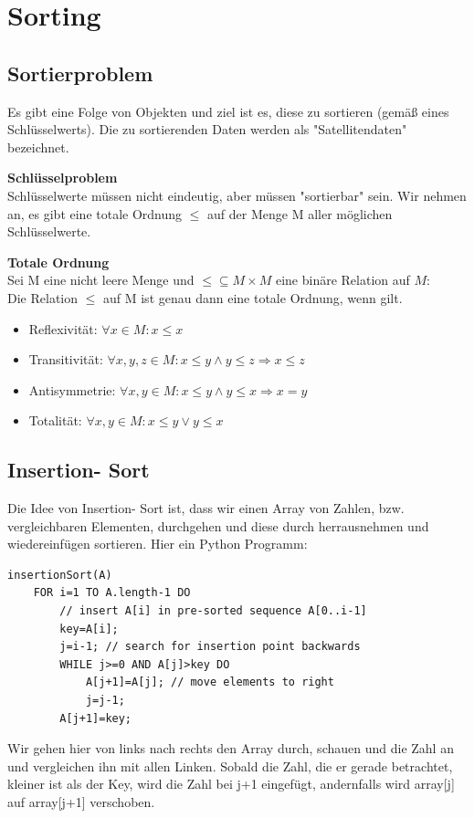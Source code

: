 \documentclass{article}
\begin{document}
    \newpage

    \section{Sorting}
        \subsection{Sortierproblem}
            Es gibt eine Folge von Objekten und ziel ist es, diese zu sortieren (gemäß eines Schlüsselwerts). 
            Die zu sortierenden Daten werden als "Satellitendaten" bezeichnet. 

            \textbf{Schlüsselproblem} \\
            Schlüsselwerte müssen nicht eindeutig, aber müssen "sortierbar" sein. Wir nehmen an, es gibt eine totale Ordnung $\leq$ auf der Menge M aller möglichen Schlüsselwerte.

            \textbf{Totale Ordnung} \\
            Sei M eine nicht leere Menge und $\leq \subseteq M \times M$ eine binäre Relation auf $M$: \\
            Die Relation $\leq$ auf M ist genau dann eine totale Ordnung, wenn gilt. 
            \begin{itemize}
                \item Reflexivität: $\forall x \in M: x \leq x$
                \item Transitivität: $\forall x,y,z \in M: x \leq y \land y \leq z \Rightarrow x \leq z$
                \item Antisymmetrie: $\forall x,y \in M: x \leq y \land y \leq x \Rightarrow x = y$
                \item Totalität: $\forall x,y \in M: x \leq y \lor y \leq x$
            \end{itemize}
            
        \subsection{Insertion- Sort}
            Die Idee von Insertion- Sort ist, dass wir einen Array von Zahlen, bzw. vergleichbaren Elementen, durchgehen und diese durch herrausnehmen und wiedereinfügen sortieren.
            Hier ein Python Programm:
            \begin{lstlisting}[style=pseudocode]
insertionSort(A)
    FOR i=1 TO A.length-1 DO
        // insert A[i] in pre-sorted sequence A[0..i-1]
        key=A[i];
        j=i-1; // search for insertion point backwards
        WHILE j>=0 AND A[j]>key DO
            A[j+1]=A[j]; // move elements to right
            j=j-1;
        A[j+1]=key;
            \end{lstlisting}
            Wir gehen hier von links nach rechts den Array durch, schauen und die Zahl an und vergleichen ihn mit allen Linken. Sobald die Zahl, die er gerade betrachtet, kleiner ist als der Key, wird die Zahl bei j+1 eingefügt, andernfalls wird array[j] auf array[j+1] verschoben.
        
\end{document}
